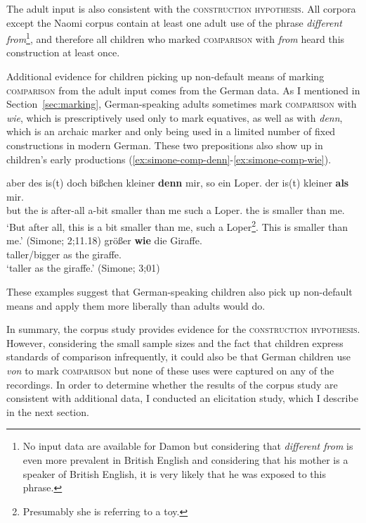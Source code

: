 \documentclass[lucida]{sp} %
\begin{document}
The adult input is also consistent with the \textsc{construction hypothesis}. All corpora except the Naomi corpus contain at least one adult use of the phrase \textit{different from}\footnote{No input data are available for Damon but considering that \textit{different from } is even more prevalent in British English and considering that his mother is a speaker of British English, it is very likely that he was exposed to this phrase.}, and therefore all children who marked \textsc{comparison} with \textit{from} heard this construction at least once.

Additional evidence for children picking up non-default means of marking \textsc{comparison} from the adult input comes from the German data. As I mentioned in Section~\ref{sec:marking}, German-speaking adults sometimes mark \textsc{comparison} with \textit{wie}, which is prescriptively used only to mark equatives, as well as with \textit{denn}, which is an archaic marker and only being used in a limited number of fixed constructions in modern German. These two prepositions also show up in children's early productions (\ref{ex:simone-comp-denn}-\ref{ex:simone-comp-wie}).
\begin{exe}
\ex \label{ex:simone-comp-denn} \gll aber des is(t) doch bißchen kleiner \textbf{denn} mir, so ein Loper. der is(t) kleiner \textbf{als} mir. \\
but the is after-all a-bit smaller than me such a Loper. the is smaller than me. \\
`But after all, this is a bit smaller than me, such a Loper\footnote{Presumably she is referring to a toy.}. This is smaller than me.' \hfill (Simone; 2;11.18)
\ex \label{ex:simone-comp-wie} \gll größer \textbf{wie} die Giraffe. \\
taller/bigger as the giraffe.\\
`taller as the giraffe.'
\hfill (Simone; 3;01)
\end{exe}
These examples suggest that German-speaking children also pick up non-default means and apply them more liberally than adults would do. 

In summary, the corpus study provides evidence for the \textsc{construction hypothesis}. However, considering the small sample sizes and the fact that children express standards of comparison infrequently, it could also be that German children use \textit{von} to mark \textsc{comparison} but none of these uses were captured on any of the recordings. In order to determine whether the results of the corpus study are consistent with additional data, I conducted an elicitation study, which I describe in the next section.
\end{document}

